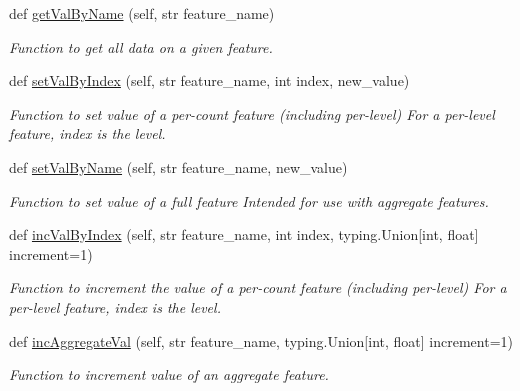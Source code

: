 \begin{DoxyCompactItemize}
def \mbox{\hyperlink{classfeature__extractors_1_1_extractor_1_1_extractor_1_1_session_features_a8debfe1452e37cf6129c4e14fbd0025d}{get\+Val\+By\+Name}} (self, str feature\+\_\+name)
\begin{DoxyCompactList}\small\item\em Function to get all data on a given feature. \end{DoxyCompactList}\item 
def \mbox{\hyperlink{classfeature__extractors_1_1_extractor_1_1_extractor_1_1_session_features_a45dc0a1a5f95a531d94e0aada54cbc7b}{set\+Val\+By\+Index}} (self, str feature\+\_\+name, int index, new\+\_\+value)
\begin{DoxyCompactList}\small\item\em Function to set value of a per-\/count feature (including per-\/level) For a per-\/level feature, index is the level. \end{DoxyCompactList}\item 
def \mbox{\hyperlink{classfeature__extractors_1_1_extractor_1_1_extractor_1_1_session_features_a3114993a908f3cfcc0fb1dd01c908925}{set\+Val\+By\+Name}} (self, str feature\+\_\+name, new\+\_\+value)
\begin{DoxyCompactList}\small\item\em Function to set value of a full feature Intended for use with aggregate features. \end{DoxyCompactList}\item 
def \mbox{\hyperlink{classfeature__extractors_1_1_extractor_1_1_extractor_1_1_session_features_affd8503fce964f8f1406627feb32ecbc}{inc\+Val\+By\+Index}} (self, str feature\+\_\+name, int index, typing.\+Union\mbox{[}int, float\mbox{]} increment=1)
\begin{DoxyCompactList}\small\item\em Function to increment the value of a per-\/count feature (including per-\/level) For a per-\/level feature, index is the level. \end{DoxyCompactList}\item 
def \mbox{\hyperlink{classfeature__extractors_1_1_extractor_1_1_extractor_1_1_session_features_a7d4f6f7bc8639f698f74228a9f14e60a}{inc\+Aggregate\+Val}} (self, str feature\+\_\+name, typing.\+Union\mbox{[}int, float\mbox{]} increment=1)
\begin{DoxyCompactList}\small\item\em Function to increment value of an aggregate feature. \end{DoxyCompactList}\end{DoxyCompactItemize}
